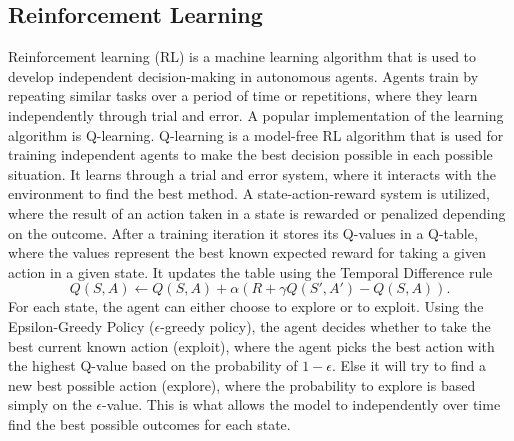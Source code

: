 \subsection{Reinforcement Learning}
Reinforcement learning (RL) is a machine learning
algorithm that is used to develop independent decision-making in autonomous agents.
Agents train by repeating similar tasks over a period of time or repetitions, where they
learn independently through trial and error. A popular implementation of the learning
algorithm is Q-learning\cite{JacobMurel1RL}. Q-learning is a model-free RL
algorithm that is used for training independent agents to make the best decision
possible in each possible situation. It learns through a trial and error system, where it
interacts with the environment to find the best method. A state-action-reward system is
utilized, where the result of an action taken in a state is rewarded or penalized
depending on the outcome. After a training iteration it stores its Q-values in a Q-table,
where the values represent the best known expected reward for taking a given action in
a given state. It updates the table using the Temporal Difference rule
\[
Q(S, A) \leftarrow Q(S, A) + \alpha \left( R + \gamma Q(S', A') - Q(S, A) \right).
\]
For each state, the agent can either choose to
explore or to exploit. Using the Epsilon-Greedy Policy (\(\epsilon\)-greedy policy), the agent
decides whether to take the best current known action (exploit), where the agent picks
the best action with the highest Q-value based on the probability of \(1-\epsilon\). Else it will try to
find a new best possible action (explore), where the probability to explore is based
simply on the \(\epsilon\)-value. This is what allows the model to independently over time find the
best possible outcomes for each state\cite{GeeksForGeeks1RL}.

